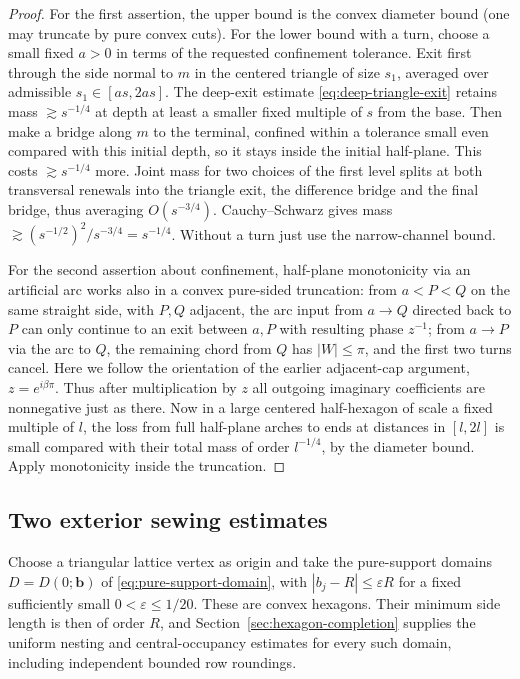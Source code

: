 \begin{proof}

For the first assertion, the upper bound is the convex diameter bound (one may truncate by pure convex cuts). For the lower bound with a turn, choose a small fixed \(a>0\) in terms of the requested confinement tolerance. Exit first through the side normal to \(m\) in the centered triangle of size \(s_1\), averaged over admissible \(s_1\in[as,2as]\). The deep-exit estimate \eqref{eq:deep-triangle-exit} retains mass \(\gtrsim s^{-1/4}\) at depth at least a smaller fixed multiple of \(s\) from the base. Then make a bridge along \(m\) to the terminal, confined within a tolerance small even compared with this initial depth, so it stays inside the initial half-plane. This costs \(\gtrsim s^{-1/4}\) more. Joint mass for two choices of the first level splits at both transversal renewals into the triangle exit, the difference bridge and the final bridge, thus averaging \(O(s^{-3/4})\). Cauchy--Schwarz gives mass \(\gtrsim (s^{-1/2})^2/s^{-3/4}=s^{-1/4}\). Without a turn just use the narrow-channel bound.

For the second assertion about confinement, half-plane monotonicity via an artificial arc works also in a convex pure-sided truncation: from \(a<P<Q\) on the same straight side, with \(P,Q\) adjacent, the arc input from \(a\to Q\) directed back to \(P\) can only continue to an exit between \(a,P\) with resulting phase \(z^{-1}\); from \(a\to P\) via the arc to \(Q\), the remaining chord from \(Q\) has \(|W|\le\pi\), and the first two turns cancel. Here we follow the orientation of the earlier adjacent-cap argument, \(z=e^{i\beta\pi}\). Thus after multiplication by \(z\) all outgoing imaginary coefficients are nonnegative just as there. Now in a large centered half-hexagon of scale a fixed multiple of \(l\), the loss from full half-plane arches to ends at distances in \([l,2l]\) is small compared with their total mass of order \(l^{-1/4}\), by the diameter bound. Apply monotonicity inside the truncation.

\end{proof}

\subsection{Two exterior sewing estimates}

Choose a triangular lattice vertex as origin and take the pure-support domains \(D=D(0;\mathbf b)\) of \eqref{eq:pure-support-domain}, with \(|b_j-R|\le\varepsilon R\) for a fixed sufficiently small \(0<\varepsilon\le1/20\). These are convex hexagons. Their minimum side length is then of order \(R\), and Section~\ref{sec:hexagon-completion} supplies the uniform nesting and central-occupancy estimates for every such domain, including independent bounded row roundings.

